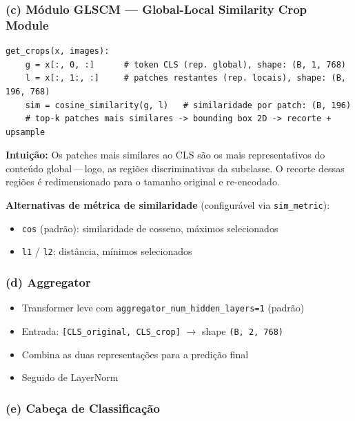 \documentclass[a4paper,12pt]{scrartcl}
\newenvironment{compactitem}%
  {\begin{itemize}\setlength{\itemsep}{1pt}\setlength{\parsep}{0pt}}%
  {\end{itemize}}
\begin{document}
\subsubsection{(c) M\'odulo GLSCM --- Global-Local Similarity Crop Module}

\begin{lstlisting}[style=pythonstyle,
  caption={L\'ogica do GLSCM (pseudoc\'odigo)}]
get_crops(x, images):
    g = x[:, 0, :]      # token CLS (rep. global), shape: (B, 1, 768)
    l = x[:, 1:, :]     # patches restantes (rep. locais), shape: (B, 196, 768)
    sim = cosine_similarity(g, l)   # similaridade por patch: (B, 196)
    # top-k patches mais similares -> bounding box 2D -> recorte + upsample
\end{lstlisting}

\textbf{Intui\c{c}\~ao:} Os patches mais similares ao CLS s\~ao os mais
representativos do conte\'udo global\,---\,logo, as regi\~oes discriminativas
da subclasse. O recorte dessas regi\~oes \'e redimensionado para o tamanho
original e re-encodado.

\textbf{Alternativas de m\'etrica de similaridade} (configur\'avel via
\texttt{sim\_metric}):
\begin{compactitem}
  \item \texttt{cos} (padr\~ao): similaridade de cosseno, m\'aximos
        selecionados
  \item \texttt{l1} / \texttt{l2}: dist\^ancia, m\'inimos selecionados
\end{compactitem}

\subsubsection{(d) Aggregator}

\begin{compactitem}
  \item Transformer leve com
        \texttt{aggregator\_num\_hidden\_layers=1} (padr\~ao)
  \item Entrada: \texttt{[CLS\_original, CLS\_crop]}
        $\to$ shape \texttt{(B, 2, 768)}
  \item Combina as duas representa\c{c}\~oes para a predi\c{c}\~ao final
  \item Seguido de LayerNorm
\end{compactitem}

\subsubsection{(e) Cabe\c{c}a de Classifica\c{c}\~ao}
\end{document}
